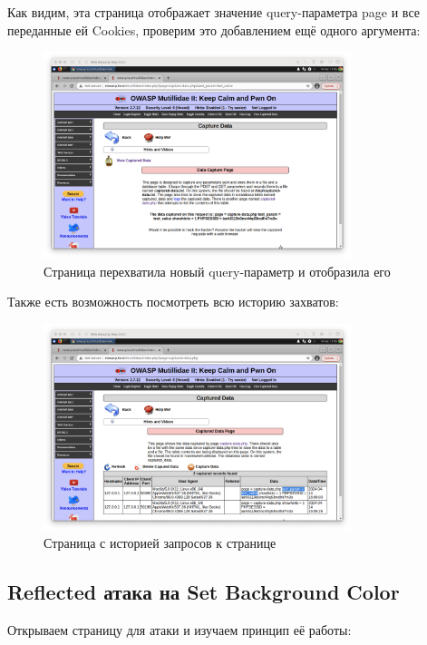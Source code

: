 \documentclass[a4paper]{article}
\begin{document}
  Как видим, эта страница отображает значение query-параметра page и все переданные ей
  Cookies, проверим это добавлением ещё одного аргумента:

  \begin{figure}[H]
    \centering
    \includegraphics[width=0.8\textwidth]{step_00014}
    \caption{Страница перехватила новый query-параметр и отобразила его}
  \end{figure}

  Также есть возможность посмотреть всю историю захватов:

  \begin{figure}[H]
    \centering
    \includegraphics[width=0.8\textwidth]{step_00015}
    \caption{Страница с историей запросов к странице}
  \end{figure}

  \subsection{Reflected атака на Set Background Color}

  Открываем страницу для атаки и изучаем принцип её работы:
\end{document}
